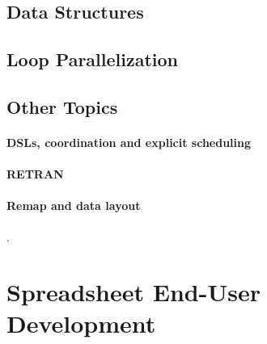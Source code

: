 \documentclass[a4paper]{article}
\begin{document}
\subsection{Data Structures}
\label{sec:data-structures}

\cite{47507, Keller:2010:RSP:1863543.1863582,
  Stucki:2015:RVP:2784731.2784739, Lowney:1981:CAI:567532.567533,
  Hall:1994:UHT:182409.156781, Arvind:1989:IDS:69558.69562}

\subsection{Loop Parallelization}
\label{sec:loop-parallelization}

\cite{Tang:1990:CTD:77726.255155, Maydan:1993:AFA:158511.158515,
  Knobe:1998:ASF:268946.268956,
  Henriksen:2014:BCI:2627373.2627388}

\subsection{Other Topics}
\label{sec:other-topics}

\paragraph{DSLs, coordination and explicit scheduling}

\cite{4228136, Ureche:2012:SCS:2103746.2103762}

\paragraph{RETRAN}

\cite{367042}

\paragraph{Remap and data layout}

\cite{Walinsky:1990:FPL:91556.91610, Deitz:2003:DIP:781498.781526,
  Sinkarovs:2013:SDL:2502323.2502332}.

\section{Spreadsheet End-User Development}
\label{sec:spreadsheet-end-user-dev}



\end{document}
